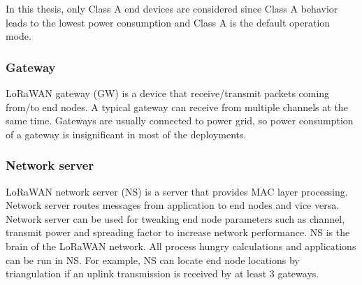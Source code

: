 In this thesis, only Class A end devices are considered since Class A behavior leads to the lowest power consumption and Class A is the default operation mode.

\newpage

\subsubsection{Gateway}

LoRaWAN gateway (GW) is a device that receive/transmit packets coming from/to end nodes. A typical gateway can receive from multiple channels at the same time. Gateways are usually connected to power grid, so power consumption of a gateway is insignificant in most of the deployments.

\subsubsection{Network server}

LoRaWAN network server (NS) is a server that provides MAC layer processing. Network server routes messages from application to end nodes and vice versa. Network server can be used for tweaking end node parameters such as channel, transmit power and spreading factor to increase network performance. NS is the brain of the LoRaWAN network. All process hungry calculations and applications can be run in NS. For example, NS can locate end node locations by triangulation if an uplink transmission is received by at least 3 gateways.

